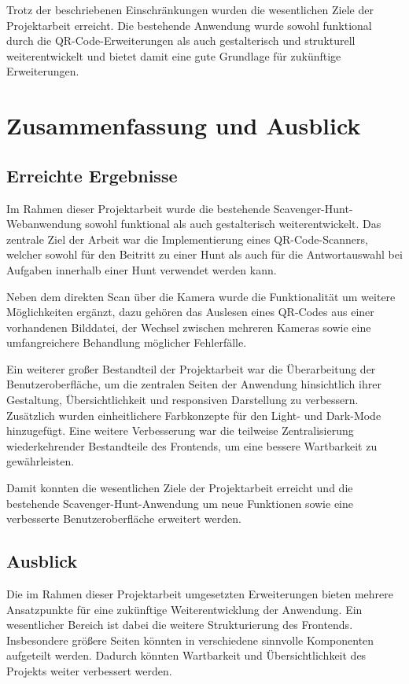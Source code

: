 ﻿\documentclass[oneside]{ausarbeitung}
\begin{document}
Trotz der beschriebenen Einschränkungen wurden die wesentlichen Ziele der Projektarbeit erreicht. Die bestehende Anwendung wurde sowohl funktional
durch die QR-Code-Erweiterungen als auch gestalterisch und strukturell weiterentwickelt und bietet damit eine gute Grundlage für zukünftige
Erweiterungen.



\chapter{Zusammenfassung und Ausblick}
\label{cha:zusammenfassung}


\section{Erreichte Ergebnisse}
\label{sec:ergebnisse}

Im Rahmen dieser Projektarbeit wurde die bestehende Scavenger-Hunt-Webanwendung sowohl funktional als auch gestalterisch weiterentwickelt. 
Das zentrale Ziel der Arbeit war die Implementierung eines QR-Code-Scanners, welcher sowohl für den Beitritt zu einer Hunt als auch für die 
Antwortauswahl bei Aufgaben innerhalb einer Hunt verwendet werden kann.

Neben dem direkten Scan über die Kamera wurde die Funktionalität um weitere Möglichkeiten ergänzt, dazu gehören das Auslesen eines QR-Codes aus
einer vorhandenen Bilddatei, der Wechsel zwischen mehreren Kameras sowie eine umfangreichere Behandlung möglicher Fehlerfälle.

Ein weiterer großer Bestandteil der Projektarbeit war die Überarbeitung der Benutzeroberfläche, um die zentralen Seiten der Anwendung hinsichtlich
ihrer Gestaltung, Übersichtlichkeit und responsiven Darstellung zu verbessern. Zusätzlich wurden einheitlichere Farbkonzepte für den Light- und Dark-Mode
hinzugefügt. Eine weitere Verbesserung war die teilweise Zentralisierung wiederkehrender Bestandteile des Frontends, um eine bessere Wartbarkeit
zu gewährleisten.

Damit konnten die wesentlichen Ziele der Projektarbeit erreicht und die bestehende Scavenger-Hunt-Anwendung um neue Funktionen sowie eine verbesserte
Benutzeroberfläche erweitert werden. 


\section{Ausblick}
\label{sec:ausblick}

Die im Rahmen dieser Projektarbeit umgesetzten Erweiterungen bieten mehrere Ansatzpunkte für eine zukünftige Weiterentwicklung der Anwendung.
Ein wesentlicher Bereich ist dabei die weitere Strukturierung des Frontends. Insbesondere größere Seiten könnten in verschiedene sinnvolle 
Komponenten aufgeteilt werden. Dadurch könnten Wartbarkeit und Übersichtlichkeit des Projekts weiter verbessert werden.
\end{document}
